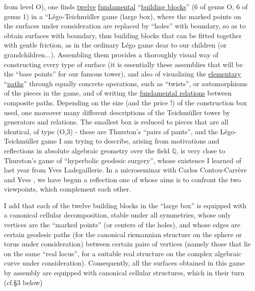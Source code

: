 
from level O), one finds \uline{twelve} \uline{fundamental} ``\uline{building blocks}''
(6 of genus O, 6 of genus 1) in a ``Légo-Teichmüller game (large
box), where the marked points on the surfaces under consideration are replaced
by ``holes'' with boundary, so as to obtain surfaces with boundary,
thus building blocks that can be fitted together with gentle
friction, as in the ordinary Légo game dear to our children
(or grandchildren...). Assembling them provides a thoroughly
visual way of constructing every type of surface (it is essentially
these assemblies that will be the ``base points'' for
our famous tower), and also of visualizing the \uline{elementary} ``\uline{paths}''
through equally concrete operations, such as ``twists'', or
automorphisms of the pieces in the game, and of writing the \uline{fundamental relations}
between composite paths. Depending on the size (and the price !) of the
construction box used, one moreover 
many different descriptions of the Teichmüller tower by generators and
relations. The smallest box is reduced to pieces that are all
identical, of type (O,3) - these are Thurston's ``pairs of pants'',
and the Légo-Teichmüller game I am trying to describe, arising from
motivations and reflections in absolute algebraic geometry over the field $\mathbb{Q}$,
is very close to Thurston's game of ``hyperbolic geodesic surgery'',
whose existence I learned of last year from Yves Ladegaillerie.
In a microseminar with Carlos Contou-Carrère and Yves ,
we have begun a reflection one of whose aims is to confront
the two viewpoints, which complement each other.

I add that each of the twelve building blocks in
the ``large box'' is equipped with a canonical cellular decomposition,
stable under all symmetries, whose only vertices are the
``marked points'' (or centers of the holes), and whose edges are certain
geodesic paths (for the canonical riemannian structure on the sphere
or torus under consideration) between certain pairs of vertices (namely those
that lie on the same ``real locus'', for a suitable real structure
on the complex algebraic curve under consideration). Consequently,
all the surfaces obtained in this game by assembly are equipped
with canonical cellular structures, which in their turn (cf.§3 below)


